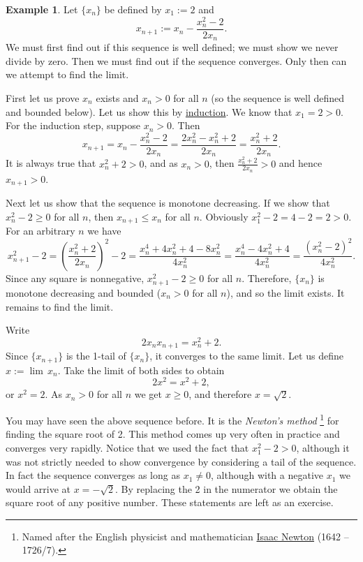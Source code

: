 \documentclass[12pt]{book}
\theoremstyle{plain}
\theoremstyle{remark}
\theoremstyle{definition}
\theoremstyle{exercise}
\theoremstyle{example}
\newtheorem{example}[thm]{Example}
\begin{document}
\begin{example}
Let $\{ x_n \}$ be defined by $x_1 := 2$ and
\begin{equation*}
x_{n+1} := x_n - \frac{x_n^2-2}{2x_n} .
\end{equation*}
We must first find out if this sequence is well defined; we must show we never
divide by zero.
Then we must find out if the sequence converges.  Only then
can we attempt to find the limit.

First let us prove 
$x_n$ exists and $x_n > 0$ for all $n$ (so the sequence is well defined
and bounded below).
Let us show this by \hyperref[induction:thm]{induction}.  We know that
$x_1 = 2 > 0$.  For the induction step, suppose $x_n > 0$.  Then
\begin{equation*}
x_{n+1} = x_n - \frac{x_n^2-2}{2x_n} =
\frac{2x_n^2 - x_n^2+2}{2x_n} =
\frac{x_n^2+2}{2x_n} .
\end{equation*}
It is always true that $x_n^2+2 > 0$,
and as
$x_n > 0$, then $\frac{x_n^2+2}{2x_n} > 0$ and hence $x_{n+1} > 0$.

Next let us
show that the sequence is monotone decreasing.  If we show that
$x_n^2-2 \geq 0$ for all $n$, then $x_{n+1} \leq x_n$ for all $n$.
Obviously $x_1^2-2 = 4-2 = 2 > 0$.  For an arbitrary $n$ we have 
\begin{equation*}
x_{n+1}^2-2 =
{\left( \frac{x_n^2+2}{2x_n} \right)}^2 - 2
=
\frac{x_n^4+4x_n^2+4 - 8x_n^2}{4x_n^2}
=
\frac{x_n^4-4x_n^2+4}{4x_n^2}
=
\frac{{\left( x_n^2-2 \right)}^2}{4x_n^2} .
\end{equation*}
Since any square is nonnegative,
$x_{n+1}^2-2 \geq 0$ for all $n$.  Therefore,
$\{ x_n \}$ is monotone decreasing and bounded ($x_n > 0$ for all $n$), and 
so the limit exists.  It remains to find the limit.

Write
\begin{equation*}
2x_nx_{n+1} = x_n^2+2 .
\end{equation*}
Since $\{ x_{n+1} \}$ is the 1-tail of $\{ x_n \}$, it converges to the
same limit.  Let us define $x := \lim\, x_n$.  Take the limit of
both sides to obtain
\begin{equation*}
2x^2 = x^2+2 ,
\end{equation*}
or $x^2 = 2$.  As $x_n > 0$ for all $n$ we get $x \geq 0$, and therefore $x = \sqrt{2}$.
\end{example}

You may have seen the above sequence before.  It is the
\emph{Newton's method}%
\footnote{%
Named after the English physicist and mathematician
\href{http://en.wikipedia.org/wiki/Isaac_Newton}{Isaac Newton} (1642 --
1726/7).}
for finding the square root of 2.  This method comes up very often in
practice and converges very rapidly.  Notice that we used the fact that
$x_1^2 -2 >0$, although it was not strictly needed to show convergence by
considering a tail of the sequence.
In fact the sequence converges as long as $x_1 \not= 0$, although with a negative $x_1$
we would arrive at $x=-\sqrt{2}$.  By replacing the 2 in the numerator we 
obtain the square root of any positive number.  These statements are left as
an exercise.
\end{document}
